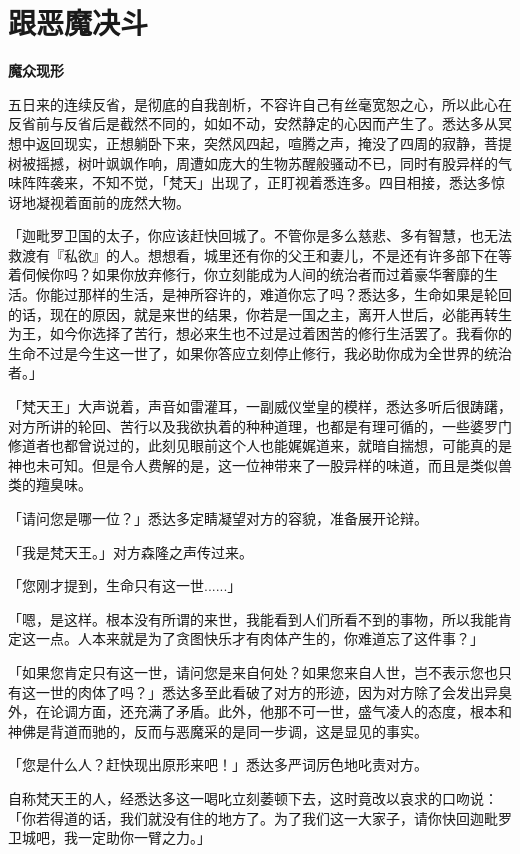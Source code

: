 \documentclass[twoside,openany]{book}
\newcommand{\mt}[1]{\textbullet \textbf{#1}}
\begin{document}
\section{跟恶魔决斗}\label{sec1.15}

\mt{魔众现形}

五日来的连续反省，是彻底的自我剖析，不容许自己有丝毫宽恕之心，所以此心在反省前与反省后是截然不同的，如如不动，安然静定的心因而产生了。悉达多从冥想中返回现实，正想躺卧下来，突然风四起，喧腾之声，掩没了四周的寂静，菩提树被摇撼，树叶飒飒作响，周遭如庞大的生物苏醒般骚动不已，同时有股异样的气味阵阵袭来，不知不觉，「梵天」出现了，正盯视着悉连多。四目相接，悉达多惊讶地凝视着面前的庞然大物。

「迦毗罗卫国的太子，你应该赶快回城了。不管你是多么慈悲、多有智慧，也无法救渡有『私欲』的人。想想看，城里还有你的父王和妻儿，不是还有许多部下在等着伺候你吗？如果你放弃修行，你立刻能成为人间的统治者而过着豪华奢靡的生活。你能过那样的生活，是神所容许的，难道你忘了吗？悉达多，生命如果是轮回的话，现在的原因，就是来世的结果，你若是一国之主，离开人世后，必能再转生为王，如今你选择了苦行，想必来生也不过是过着困苦的修行生活罢了。我看你的生命不过是今生这一世了，如果你答应立刻停止修行，我必助你成为全世界的统治者。」

「梵天王」大声说着，声音如雷灌耳，一副威仪堂皇的模样，悉达多听后很踌躇，对方所讲的轮回、苦行以及我欲执着的种种道理，也都是有理可循的，一些婆罗门修道者也都曾说过的，此刻见眼前这个人也能娓娓道来，就暗自揣想，可能真的是神也未可知。但是令人费解的是，这一位神带来了一股异样的味道，而且是类似兽类的羶臭味。

「请问您是哪一位？」悉达多定睛凝望对方的容貌，准备展开论辩。

「我是梵天王。」对方森隆之声传过来。

「您刚才提到，生命只有这一世......」

「嗯，是这样。根本没有所谓的来世，我能看到人们所看不到的事物，所以我能肯定这一点。人本来就是为了贪图快乐才有肉体产生的，你难道忘了这件事？」

「如果您肯定只有这一世，请问您是来自何处？如果您来自人世，岂不表示您也只有这一世的肉体了吗？」悉达多至此看破了对方的形迹，因为对方除了会发出异臭外，在论调方面，还充满了矛盾。此外，他那不可一世，盛气凌人的态度，根本和神佛是背道而驰的，反而与恶魔采的是同一步调，这是显见的事实。

「您是什么人？赶快现出原形来吧！」悉达多严词厉色地叱责对方。

自称梵天王的人，经悉达多这一喝叱立刻萎顿下去，这时竟改以哀求的口吻说：「你若得道的话，我们就没有住的地方了。为了我们这一大家子，请你快回迦毗罗卫城吧，我一定助你一臂之力。」
\end{document}

